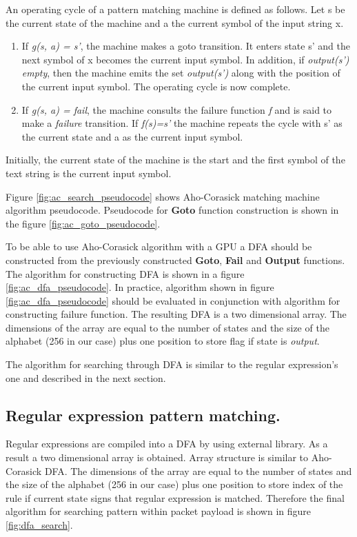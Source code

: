 \documentclass[thesis=M,english]{FITthesis}[2011/07/15]
\begin{document}
An operating cycle of a pattern matching machine is defined as follows. Let s be the current state of the machine and a the current symbol of the input string x.
\begin{enumerate}
\item If \emph{g(s, a) = s'}, the machine makes a goto transition. It enters state s' and the next symbol of x becomes the current input symbol.
In addition, if  \emph{output(s')  empty}, then the machine emits the set \emph{output(s')} along with the position of the current input symbol. The operating cycle is now complete.
\item If \emph{g(s, a) = fail}, the machine consults the failure function \emph{f} and is said to make a \emph{failure} transition. If \emph{f(s)=s'} the machine repeats the cycle with s' as the current state and a as the current input symbol.
\end{enumerate}
Initially, the current state of the machine is the start and the first symbol of the text string is the current input symbol. 

Figure \ref{fig:ac_search_pseudocode} shows Aho-Corasick matching machine algorithm pseudocode. Pseudocode for \textbf{Goto} function construction is shown in the figure \ref{fig:ac_goto_pseudocode}.

To be able to use Aho-Corasick algorithm with a GPU a DFA should be constructed from the previously constructed \textbf{Goto}, \textbf{Fail} and \textbf{Output} functions. The algorithm for constructing DFA is shown in a figure \ref{fig:ac_dfa_pseudocode}. In practice, algorithm shown in figure \ref{fig:ac_dfa_pseudocode} should be evaluated in conjunction with algorithm for constructing failure function. The resulting DFA is a two dimensional array. The dimensions of the array are equal to the number of states and the size of the alphabet (256 in our case) plus one position to store flag if state is \emph{output}.

The algorithm for searching through DFA is similar to the regular expression's one and described in the next section.

\subsection*{Regular expression pattern matching.}
Regular expressions are compiled into a DFA by using external library. As a result a two dimensional array is obtained. Array structure is similar to Aho-Corasick DFA. The dimensions of the array are equal to the number of states and the size of the alphabet (256 in our case) plus one position to store index of the rule if current state signs that regular expression is matched. Therefore the final algorithm for searching pattern within packet payload is shown in figure \ref{fig:dfa_search}.
\end{document}
